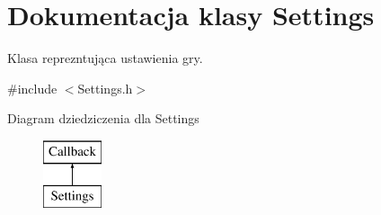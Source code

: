 \section{Dokumentacja klasy Settings}
\label{class_settings}


Klasa reprezntująca ustawienia gry.  




{\ttfamily \#include $<$Settings.\+h$>$}

Diagram dziedziczenia dla Settings\begin{figure}[H]
\begin{center}
\leavevmode
\includegraphics[height=2.000000cm]{class_settings}
\end{center}
\end{figure}
